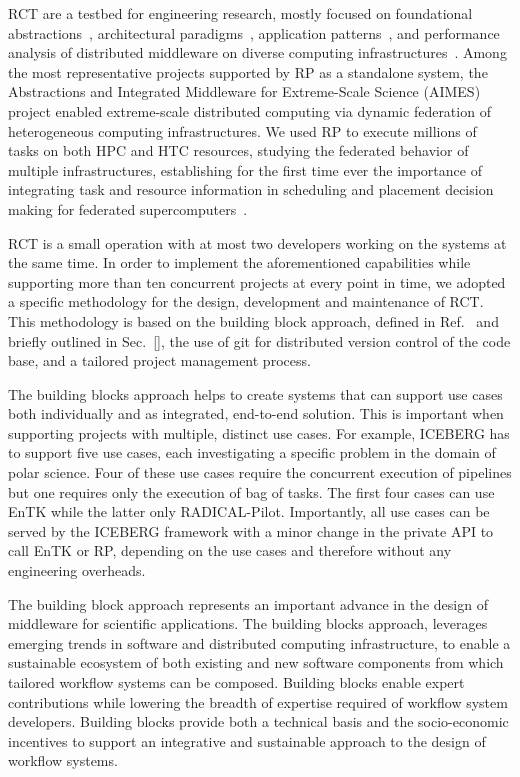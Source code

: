 \documentclass[preprint,12pt, a4paper]{elsarticle}
\begin{document}
RCT are a testbed for engineering research, mostly focused on foundational
abstractions~\cite{}, architectural paradigms~\cite{}, application
patterns~\cite{}, and performance analysis of distributed middleware on
diverse computing infrastructures~\cite{}. Among the most representative
projects supported by RP as a standalone system, the Abstractions and
Integrated Middleware for Extreme-Scale Science (AIMES) project enabled
extreme-scale distributed computing via dynamic federation of heterogeneous
computing infrastructures. We used RP to execute millions of tasks on both
HPC and HTC resources, studying the federated behavior of multiple
infrastructures, establishing for the first time ever the importance of
integrating task and resource information in scheduling and placement
decision making for federated supercomputers~\cite{}.

RCT is a small operation with at most two developers working on the systems
at the same time. In order to implement the aforementioned capabilities while
supporting more than ten concurrent projects at every point in time, we
adopted a specific methodology for the design, development and maintenance of
RCT. This methodology is based on the building block approach, defined in
Ref.~\cite{bb} and briefly outlined in Sec.~\ref{}, the use of git for
distributed version control of the code base, and a tailored project
management process.

The building blocks approach helps to create systems that can support use
cases both individually and as integrated, end-to-end solution. This is
important when supporting projects with multiple, distinct use cases. For
example, ICEBERG has to support five use cases, each investigating a specific
problem in the domain of polar science. Four of these use cases require the
concurrent execution of pipelines but one requires only the execution of bag
of tasks. The first four cases can use EnTK while the latter only
RADICAL-Pilot. Importantly, all use cases can be served by the ICEBERG
framework with a minor change in the private API to call EnTK or RP,
depending on the use cases and therefore without any engineering overheads.

The building block approach represents an important advance in the design of
middleware for scientific applications. The building blocks approach,
leverages emerging trends in software and distributed computing
infrastructure, to enable a sustainable ecosystem of both existing and new
software components from which tailored workflow systems can be composed.
Building blocks enable expert contributions while lowering the breadth of
expertise required of workflow system developers. Building blocks provide
both a technical basis and the socio-economic incentives to support an
integrative and sustainable approach to the design of workflow systems.
\end{document}
